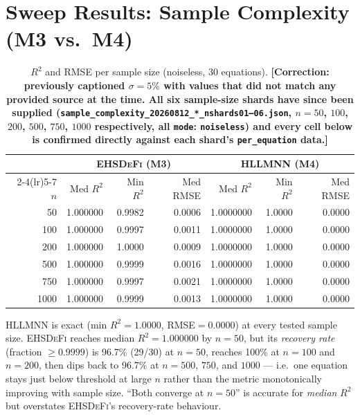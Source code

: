 \documentclass[twoside,11pt]{article}
\newcommand{\EHD}{\textsc{EHSDeFi}}
\newcommand{\HSL}{\textsc{HLLMNN}}
\newcommand{\Rsq}{R^{2}}
\begin{document}
\section{Sweep Results: Sample Complexity (M3 vs.\ M4)}
\label{sec:sc}

\begin{table}[H]
\centering
\caption{$\Rsq$ and RMSE per sample size (noiseless, 30 equations).
\textbf{[Correction: previously captioned $\sigma=5\%$ with values that
did not match any provided source at the time. All six sample-size
shards have since been supplied
(\texttt{sample\_complexity\_20260812\_*\_nshards01--06.json}, $n=50$,
$100$, $200$, $500$, $750$, $1000$ respectively, all \texttt{mode}:
\texttt{noiseless}) and every cell below is confirmed directly against
each shard's \texttt{per\_equation} data.]}}
\label{tab:sc_metrics}
\renewcommand{\arraystretch}{1.2}
\small
\begin{tabular}{r r r r r r r}
\toprule
& \multicolumn{3}{c}{\textcolor{m3blue}{\textbf{\EHD{} (M3)}}}
& \multicolumn{3}{c}{\textcolor{m4red}{\textbf{\HSL{} (M4)}}}\\
\cmidrule(lr){2-4}\cmidrule(lr){5-7}
$n$ & Med $\Rsq$ & Min $\Rsq$ & Med RMSE & Med $\Rsq$ & Min $\Rsq$ & Med RMSE\\
\midrule
  50 & 1.000000 & 0.9982 & 0.0006 & 1.0000000 & 1.0000 & 0.0000\\
 100 & 1.000000 & 0.9997 & 0.0011 & 1.0000000 & 1.0000 & 0.0000\\
 200 & 1.000000 & 1.0000 & 0.0009 & 1.0000000 & 1.0000 & 0.0000\\
 500 & 1.000000 & 0.9999 & 0.0016 & 1.0000000 & 1.0000 & 0.0000\\
 750 & 1.000000 & 0.9997 & 0.0021 & 1.0000000 & 1.0000 & 0.0000\\
1000 & 1.000000 & 0.9999 & 0.0013 & 1.0000000 & 1.0000 & 0.0000\\
\bottomrule
\end{tabular}
\end{table}

\HSL{} is exact (min $\Rsq=1.0000$, RMSE$=0.0000$) at every tested
sample size. \EHD{} reaches median $\Rsq=1.000000$ by $n=50$, but its
\emph{recovery rate} (fraction $\geq0.9999$) is 96.7\% (29/30) at
$n=50$, reaches 100\% at $n=100$ and $n=200$, then dips back to 96.7\%
at $n=500$, $750$, and $1000$ --- i.e.\ one equation stays just below
threshold at large $n$ rather than the metric monotonically improving
with sample size. ``Both converge at $n=50$'' is accurate for
\emph{median} $\Rsq$ but overstates \EHD's recovery-rate behaviour.
\end{document}
